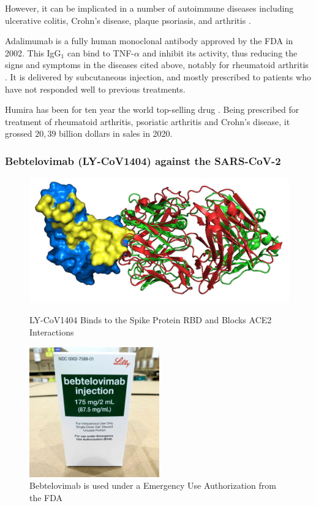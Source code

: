 However, it can be implicated in a number of autoimmune diseases including
ulcerative colitis, Crohn’s disease, plaque psoriasis, and arthritis
\cite{noauthor_adalimumab_2021}.

Adalimumab is a fully human monoclonal antibody approved by the FDA in 2002.
This IgG$_1$ can bind to TNF-$\alpha$ and inhibit its activity, thus reducing the 
signs and symptoms in the diseases cited above, notably for rheumatoid arthritis
\cite{mease_adalimumab_2007}. It is delivered by subcutaneous injection, and mostly
prescribed to patients who have not responded well to previous treatments.

Humira has been for ten year the world top-selling drug \cite{fierce_pharma_humira_2021}.
Being prescribed for treatment of rheumatoid arthritis, psoriatic arthritis and Crohn’s disease,
it grossed $20,39$ billion dollars in sales in 2020.


\subsubsection{Bebtelovimab (LY-CoV1404) against the SARS-CoV-2}
\begin{figure}[H]
    \begin{minipage}{0.49\textwidth}
        \centering
        \includegraphics[width=\textwidth]{../Images/LY-CoV1404_spike_protein.png}
        \caption{LY-CoV1404 Binds to the Spike Protein RBD and Blocks ACE2 Interactions}
        \label{fig:LY-CoV1404_spike_protein}
    \end{minipage}\hfill
    \begin{minipage}{0.49\textwidth}
        \centering
        \includegraphics[width=0.5\textwidth]{../Images/bebtelovimab.jpg}   
        \caption{Bebtelovimab is used under a Emergency Use Authorization from the FDA}
        \label{fig:bebtelovimab}
    \end{minipage}
\end{figure}


